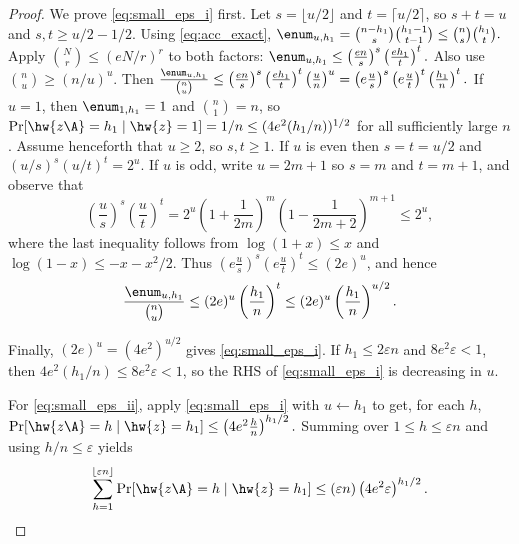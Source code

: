 \begin{proof}
We prove \eqref{eq:small_eps_i} first. Let $s=\lfloor u/2\rfloor$ and
$t=\lceil u/2\rceil$, so $s+t=u$ and $s,t\ge u/2-1/2$. Using
\eqref{eq:acc_exact},
$
\enum_{u,h_1}
=
\binom{n-h_1}{s}\binom{h_1-1}{t-1}
\le
\binom{n}{s}\binom{h_1}{t}.
$
Apply $\binom{N}{r}\le (eN/r)^r$ to both factors:
$
\enum_{u,h_1}
\le
\left(\frac{en}{s}\right)^s\left(\frac{eh_1}{t}\right)^t.
$
Also use $\binom{n}{u}\ge (n/u)^u$. Then
$
\frac{\enum_{u,h_1}}{\binom{n}{u}}
\le
\left(\frac{en}{s}\right)^s\left(\frac{eh_1}{t}\right)^t\left(\frac{u}{n}\right)^u
=
\left(e\frac{u}{s}\right)^s\left(e\frac{u}{t}\right)^t\left(\frac{h_1}{n}\right)^t.
$
If $u=1$, then $\enum_{1,h_1}=1$ and $\binom{n}{1}=n$, so
$\Pr[\hw{z\A}=h_1\mid \hw{z}=1]=1/n\le (4e^2(h_1/n))^{1/2}$ for all sufficiently large $n$.
Assume henceforth that $u\ge 2$, so $s,t\ge 1$.
If $u$ is even then $s=t=u/2$ and $(u/s)^s(u/t)^t=2^u$.
If $u$ is odd, write $u=2m+1$ so $s=m$ and $t=m+1$, and observe that
\[
\left(\frac{u}{s}\right)^s\left(\frac{u}{t}\right)^t
=
2^u\left(1+\frac{1}{2m}\right)^m\left(1-\frac{1}{2m+2}\right)^{m+1}
\le 2^u,
\]
where the last inequality follows from $\log(1+x)\le x$ and $\log(1-x)\le -x-x^2/2$.
Thus $\left(e\frac{u}{s}\right)^s\left(e\frac{u}{t}\right)^t \le (2e)^u$, and hence
\[
\frac{\enum_{u,h_1}}{\binom{n}{u}}
\le
(2e)^{u}\left(\frac{h_1}{n}\right)^{t}
\le
(2e)^{u}\left(\frac{h_1}{n}\right)^{u/2}.
\]


Finally, $(2e)^u=(4e^2)^{u/2}$ gives \eqref{eq:small_eps_i}. If
$h_1\le 2\varepsilon n$ and $8e^2\varepsilon<1$, then
$4e^2(h_1/n)\le 8e^2\varepsilon<1$, so the RHS of \eqref{eq:small_eps_i} is
decreasing in $u$.

For \eqref{eq:small_eps_ii}, apply \eqref{eq:small_eps_i} with $u\leftarrow h_1$
to get, for each $h$,
$
\Pr[\hw{z\A}=h\mid \hw{z}=h_1]
\le
\left(4e^2\frac{h}{n}\right)^{h_1/2}.
$
Summing over $1\le h\le \varepsilon n$ and using $h/n\le \varepsilon$ yields
\[
\sum_{h=1}^{\lfloor \varepsilon n\rfloor}
\Pr[\hw{z\A}=h\mid \hw{z}=h_1]
\le
(\varepsilon n)\left(4e^2\varepsilon\right)^{h_1/2}.
\]
\end{proof}


